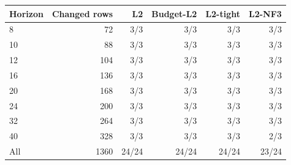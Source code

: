 \begin{tabular}{lrrrrr}
\toprule
Horizon & Changed rows & L2 & Budget-L2 & L2-tight & L2-NF3\\
\midrule
8 & 72 & 3/3 & 3/3 & 3/3 & 3/3\\
10 & 88 & 3/3 & 3/3 & 3/3 & 3/3\\
12 & 104 & 3/3 & 3/3 & 3/3 & 3/3\\
16 & 136 & 3/3 & 3/3 & 3/3 & 3/3\\
20 & 168 & 3/3 & 3/3 & 3/3 & 3/3\\
24 & 200 & 3/3 & 3/3 & 3/3 & 3/3\\
32 & 264 & 3/3 & 3/3 & 3/3 & 3/3\\
40 & 328 & 3/3 & 3/3 & 3/3 & 2/3\\
All & 1360 & 24/24 & 24/24 & 24/24 & 23/24\\
\bottomrule
\end{tabular}
